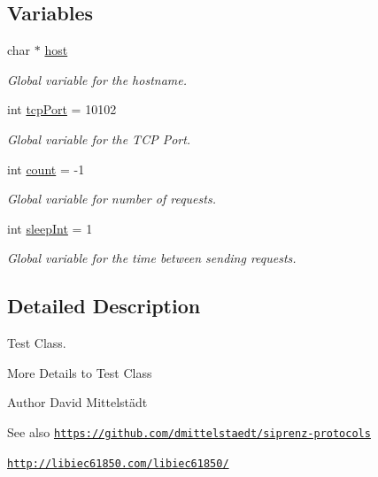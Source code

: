 \subsection*{Variables}
\begin{DoxyCompactItemize}
\item 
char $\ast$ \hyperlink{simple-iec61850-client_8c_a1c2046dcb30a629d6d9f45ff8f403f12}{host}
\begin{DoxyCompactList}\small\item\em Global variable for the hostname. \end{DoxyCompactList}\item 
int \hyperlink{simple-iec61850-client_8c_ac31354d08316076b496efb2b3a2c69e6}{tcp\+Port} = 10102
\begin{DoxyCompactList}\small\item\em Global variable for the T\+CP Port. \end{DoxyCompactList}\item 
int \hyperlink{simple-iec61850-client_8c_ad43c3812e6d13e0518d9f8b8f463ffcf}{count} = -\/1
\begin{DoxyCompactList}\small\item\em Global variable for number of requests. \end{DoxyCompactList}\item 
int \hyperlink{simple-iec61850-client_8c_a7c0b25939579bd308b11966fb04288e0}{sleep\+Int} = 1
\begin{DoxyCompactList}\small\item\em Global variable for the time between sending requests. \end{DoxyCompactList}\end{DoxyCompactItemize}


\subsection{Detailed Description}
Test Class. 

More Details to Test Class

\begin{DoxyAuthor}{Author}
David Mittelstädt 
\end{DoxyAuthor}
\begin{DoxySeeAlso}{See also}
\href{https://github.com/dmittelstaedt/siprenz-protocols}{\tt https\+://github.\+com/dmittelstaedt/siprenz-\/protocols} 

\href{http://libiec61850.com/libiec61850/}{\tt http\+://libiec61850.\+com/libiec61850/} 
\end{DoxySeeAlso}


